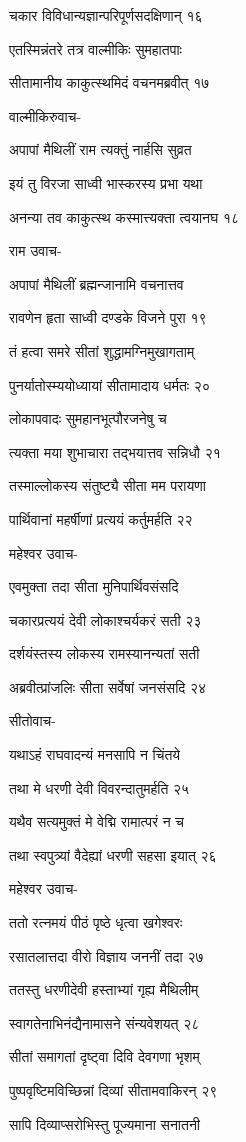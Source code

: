 चकार विविधान्यज्ञान्परिपूर्णसदक्षिणान् १६

एतस्मिन्नंतरे तत्र वाल्मीकिः सुमहातपाः

सीतामानीय काकुत्स्थमिदं वचनमब्रवीत् १७

वाल्मीकिरुवाच-

अपापां मैथिलीं राम त्यक्तुं नार्हसि सुव्रत

इयं तु विरजा साध्वी भास्करस्य प्रभा यथा

अनन्या तव काकुत्स्थ कस्मात्त्यक्ता त्वयानघ १८

राम उवाच-

अपापां मैथिलीं ब्रह्मन्जानामि वचनात्तव

रावणेन हृता साध्वी दण्डके विजने पुरा १९

तं हत्वा समरे सीतां शुद्धामग्निमुखागताम्

पुनर्यातोस्म्ययोध्यायां सीतामादाय धर्मतः २०

लोकापवादः सुमहानभूत्पौरजनेषु च

त्यक्ता मया शुभाचारा तद्भयात्तव सन्निधौ २१

तस्माल्लोकस्य संतुष्ट्यै सीता मम परायणा

पार्थिवानां महर्षीणां प्रत्ययं कर्तुमर्हति २२

महेश्वर उवाच-

एवमुक्ता तदा सीता मुनिपार्थिवसंसदि

चकारप्रत्ययं देवी लोकाश्चर्यकरं सती २३

दर्शयंस्तस्य लोकस्य रामस्यानन्यतां सती

अब्रवीत्प्रांजलिः सीता सर्वेषां जनसंसदि २४

सीतोवाच-

यथाऽहं राघवादन्यं मनसापि न चिंतये

तथा मे धरणी देवी विवरन्दातुमर्हति २५

यथैव सत्यमुक्तं मे वेद्मि रामात्परं न च

तथा स्वपुत्र्यां वैदेह्यां धरणी सहसा इयात् २६

महेश्वर उवाच-

ततो रत्नमयं पीठं पृष्ठे धृत्वा खगेश्वरः

रसातलात्तदा वीरो विज्ञाय जननीं तदा २७

ततस्तु धरणीदेवी हस्ताभ्यां गृह्य मैथिलीम्

स्वागतेनाभिनंद्यैनामासने संन्यवेशयत् २८

सीतां समागतां दृष्ट्वा दिवि देवगणा भृशम्

पुष्पवृष्टिमविच्छिन्नां दिव्यां सीतामवाकिरन् २९

सापि दिव्याप्सरोभिस्तु पूज्यमाना सनातनी

